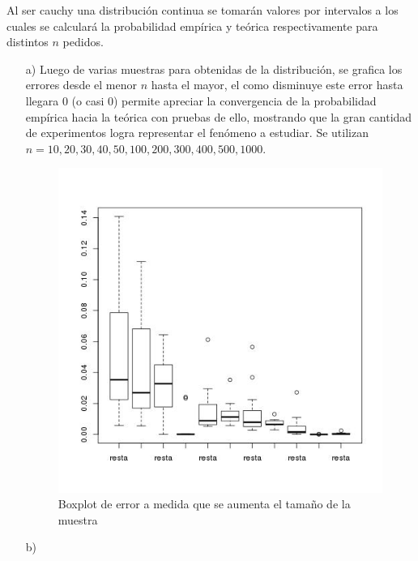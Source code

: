 \documentclass[letter,10pt]{article}
\begin{document}
Al ser cauchy una distribución continua se tomarán valores por intervalos a los cuales se calculará la probabilidad
empírica y teórica respectivamente para distintos $n$ pedidos.
\begin{itemize}
 \item[a)] 
      Luego de varias muestras para obtenidas de la distribución, se grafica los errores desde el menor $n$ hasta el mayor, el como
      disminuye este error hasta llegara 0 (o casi 0) permite apreciar la convergencia de la probabilidad empírica hacia la teórica con pruebas
      de ello, mostrando que la gran cantidad de experimentos logra representar el fenómeno a estudiar. Se utilizan $n=10,20,30,40,50,100,200,300,400,500,1000$.
     
      \begin{figure}[H]
	      \centering
              \includegraphics[width=\linewidth]{p5_boxplot.jpg}
              \caption{Boxplot de error a medida que se aumenta el tamaño de la muestra}
          \end{figure}
      
 \item[b)]
 

\end{itemize}
\end{document}
